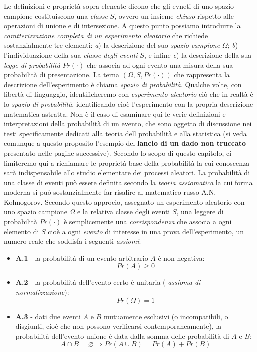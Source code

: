 \documentclass[12pt,oneside,openany]{memoir}
\numberwithin{equation}{subsection}
\begin{document}
Le definizioni e propriet\`a sopra elencate dicono che gli evneti di uno spazio
campione costituiscono una \textit{classe} $S$, ovvero un insieme
\textit{chiuso} rispetto alle operazioni di unione e di intersezione. \bigbreak
A questo punto possiamo introdurre la \textit{caratterizzazione completa di un
esperimento aleatorio} che richiede sostanzialmente tre elementi: \textit{a}) la
descrizione del suo \textit{spazio campione} $\Omega$; \textit{b})
l'individuazione della sua \textit{classe degli eventi} $S$, e infine
\textit{c}) la descrizione della sua \textit{legge di probabilit\`a} $Pr(\cdot)$
che associa ad ogni evento una misura della sua probabilit\`a di presentazione.
La terna $(\Omega, S, Pr(\cdot))$ che rappresenta la descrizione
dell'esperimento \`e chiama \textit{spazio di probabilit\`a}. Qualche volte, con
libert\`a di linguaggio, identificheremo con \textit{esperimento aleatorio}
ci\`o che in realt\`a \`e lo \textit{spazio di probabilit\`a}, identificando
cio\`e l'esperimento con la propria descrizione matematica astratta.
\bigbreak
Non \`e il caso di esaminare qui le verie definizioni e interpretazioni della
probabilit\`a di un evento, che sono oggetto di discussione nei testi
specificamente dedicati alla teoria dell probabilit\`a e alla statistica (si
veda comunque a questo proposito l'esempio del \textbf{lancio di un dado non
truccato} presentato nelle pagine successive). Secondo lo scopo di questo
capitolo, ci limiteremo qui a richiamare le propriet\`a base della probabilit\`a
la cui conoscenza sar\`a indispensabile allo studio elementare dei processi
aleatori.
\bigbreak
La probabilit\`a di una classe di eventi pu\`o essere definita secondo la
\textit{teoria assiomatica} la cui forma moderna si pu\`o sostanzialmente far
risalire al matematico russo A.N. Kolmogorov. Secondo questo approcio, assegnato
un esperimento aleatorio con uno spazio campione $\Omega$ e la relativa classe
degli eventi $S$, una leggere di probabilit\`a $Pr(\cdot)$ \`e semplicemente una
\textit{corrispondenza} che associa a ogni elemento di $S$ cio\`e a ogni
\textit{evento} di interesse in una prova dell'esperimento, un numero reale che
soddisfa i seguenti \textit{assiomi}:
\begin{itemize}
	\item \textbf{A.1} - la probabilit\`a di un evento arbitrario $A$ \`e non
        negativa:
	    \[
		    Pr(A) \geq 0
	    \]
	\item \textbf{A.2} - la probabilit\`a dell'evento certo \`e unitaria (
        \textit{assioma di normalizzazione}):
	    \[
		    Pr(\Omega) = 1
	    \]
	\item \textbf{A.3} - dati due eventi $A$ e $B$ mutuamente esclusivi (o 
        incompatibili, o disgiunti, cio\`e che non possono verificarsi 
        contemporaneamente), la probabilit\`a dell'evento unione \`e data dalla 
        somma delle probabilit\`a di $A$ e $B$:
	    \[
		    A \cap B = \varnothing \Rightarrow Pr(A \cup B) = Pr(A) + Pr(B)
	    \]
\end{itemize}
\end{document}
